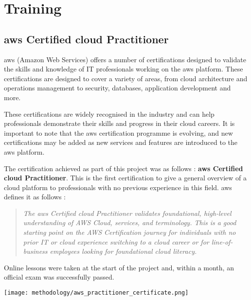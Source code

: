 \section{Training}

\subsection{\gls{aws} Certified \Gls{cloud} Practitioner}
\gls{aws} (Amazon Web Services) offers a number of certifications designed to validate the skills and knowledge of IT professionals working on the \gls{aws} platform. These certifications are designed to cover a variety of areas, from cloud architecture and operations management to security, databases, application development and more.

These certifications are widely recognised in the industry and can help professionals demonstrate their skills and progress in their \gls{cloud} careers. It is important to note that the \gls{aws} certification programme is evolving, and new certifications may be added as new services and features are introduced to the \gls{aws} platform.

The certification achieved as part of this project was as follows : \textbf{\gls{aws} Certified \Gls{cloud} Practitioner}. This is the first certification to give a general overview of a \gls{cloud} platform to professionals with no previous experience in this field. \gls{aws} defines it as follows :
\begin{quote}
    \textit{The \gls{aws} Certified \Gls{cloud} Practitioner validates foundational, high-level understanding of AWS Cloud, services, and terminology.  This is a good starting point on the AWS Certification journey for individuals with no prior IT or cloud experience switching to a cloud career or for line-of-business employees looking for foundational cloud literacy. \cite{aws_practitioner_certificate}}\\
\end{quote}
Online lessons were taken at the start of the project and, within a month, an official exam was successfully passed.
\begin{center}
    \begingroup
    \texttt{[image: methodology/aws\_practitioner\_certificate.png]}
    \label{fig:aws_practitioner_certificate}
    \endgroup
\end{center}
